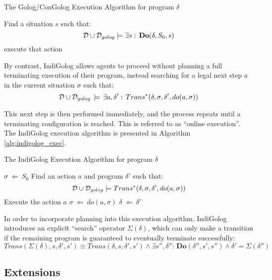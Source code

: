 %
\begin{algorithm}
\caption{The Golog/ConGolog Execution Algorithm for program $\delta$}


\label{alg:golog_exec} \begin{algorithmic} \STATE Find a situation
$s$ such that:\[
\mathcal{D}\cup\mathcal{D}_{golog}\models\exists s:\,\mathbf{Do}(\delta,S_{0},s)\]
  \STATE execute
that action \ENDFOR \end{algorithmic} 
\end{algorithm}


By contrast, IndiGolog allows agents to proceed without planning a
full terminating execution of their program, instead searching for
a legal next step $a$ in the current situation $\sigma$ such that:\[
\mathcal{D}\cup\mathcal{D}_{golog}\,\models\,\exists a,\delta':\, Trans^{*}(\delta,\sigma,\delta',do(a,\sigma))\]


This next step is then performed immediately, and the process repeats
until a terminating configuration is reached. This is referred to
as {}``online execution''. The IndiGolog execution algorithm is
presented in Algorithm \ref{alg:indigolog_exec}.

%
\begin{algorithm}
\caption{The IndiGolog Execution Algorithm for program $\delta$}


\label{alg:indigolog_exec} \begin{algorithmic} \STATE $\sigma\ \Leftarrow\ S_{0}$
 \STATE
Find an action $a$ and program $\delta'$ such that: \[
\mathcal{D}\cup\mathcal{D}_{golog}\models Trans^{*}(\delta,\sigma,\delta',do(a,\sigma))\]
 \STATE Execute the action $a$ \STATE $\sigma\ \Leftarrow\ do(a,\sigma)$
\STATE $\delta\ \Leftarrow\ \delta'$ \ENDWHILE \end{algorithmic} 
\end{algorithm}


In order to incorporate planning into this execution algorithm, IndiGolog
introduces an explicit {}``search'' operator $\Sigma(\delta)$,
which can only make a transition if the remaining program is guaranteed
to eventually terminate successfully:\[
Trans(\Sigma(\delta),s,\delta',s')\equiv Trans(\delta,s,\delta',s')\wedge\exists s'',\delta'':\,\mathbf{Do}(\delta'',s',s'')\wedge\delta'=\Sigma(\delta'')\]



\subsection{Extensions}

